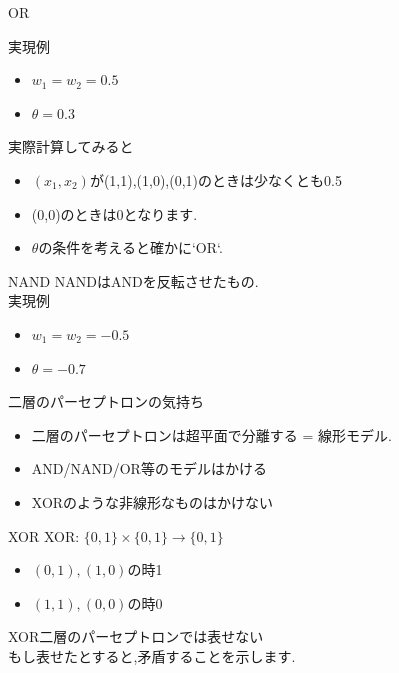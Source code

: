 \begin{frame}[fragile]{OR}

実現例
\begin{itemize}
  \item $w_1 = w_2 = 0.5$
  \item $\theta = 0.3$
\end{itemize}
実際計算してみると

\begin{itemize}
\item $(x_1, x_2)$が(1,1),(1,0),(0,1)のときは少なくとも0.5
\item (0,0)のときは0となります.
\item $\theta$の条件を考えると確かに`OR`.
\end{itemize}
\end{frame}


\begin{frame}[fragile]{NAND}
NANDはANDを反転させたもの. \\
実現例
\begin{itemize}
  \item $w_1 = w_2 = -0.5$
  \item $\theta = - 0.7$
\end{itemize}
\end{frame}


\begin{frame}[fragile]{二層のパーセプトロンの気持ち}
\begin{itemize}
\item 二層のパーセプトロンは超平面で分離する = 線形モデル.
\item AND/NAND/OR等のモデルはかける
\item XORのような非線形なものはかけない
\end{itemize}
\end{frame}

\begin{frame}[fragile]{XOR}
XOR: $ \{0, 1\} \times  \{0, 1\} \to  \{0, 1\}$
\begin{itemize}
  \item $(0, 1), (1, 0)$の時1
  \item $(1, 1),(0, 0)$の時0
\end{itemize}

XOR二層のパーセプトロンでは表せない \\
もし表せたとすると,矛盾することを示します.
\end{frame}


